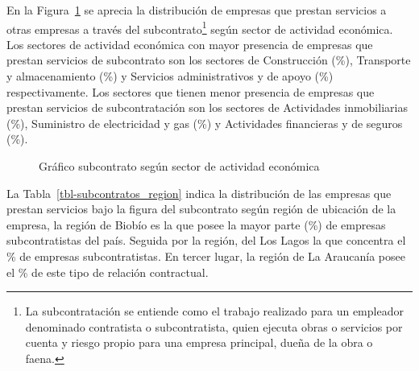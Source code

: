 \documentclass[
  11pt,
]{article}
\begin{document}
En la Figura~\ref{fig-subcontratos_sector} se aprecia la distribución de
empresas que prestan servicios a otras empresas a través del
subcontrato\footnote{La subcontratación se entiende como el trabajo
  realizado para un empleador denominado contratista o subcontratista,
  quien ejecuta obras o servicios por cuenta y riesgo propio para una
  empresa principal, dueña de la obra o faena.} según sector de
actividad económica. Los sectores de actividad económica con mayor
presencia de empresas que prestan servicios de subcontrato son los
sectores de Construcción (\%), Transporte y almacenamiento
(\%) y Servicios administrativos y de apoyo (\%)
respectivamente. Los sectores que tienen menor presencia de empresas que
prestan servicios de subcontratación son los sectores de Actividades
inmobiliarias (\%), Suministro de electricidad y gas
(\%) y Actividades financieras y de seguros (\%).

\begin{figure}[H]

\caption{\label{fig-subcontratos_sector}Gráfico subcontrato según sector
de actividad económica}


\end{figure}%

La Tabla~\ref{tbl-subcontratos_region} indica la distribución de las
empresas que prestan servicios bajo la figura del subcontrato según
región de ubicación de la empresa, la región de Biobío es la que posee
la mayor parte (\%) de empresas subcontratistas del país.
Seguida por la región, del Los Lagos la que concentra el \% de
empresas subcontratistas. En tercer lugar, la región de La Araucanía
posee el \% de este tipo de relación contractual.
\end{document}
